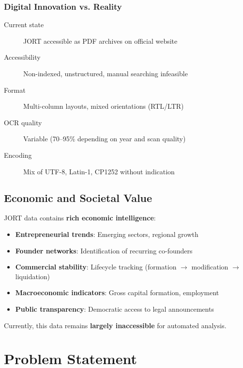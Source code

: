 \documentclass[12pt,a4paper]{report}
\begin{document}
\subsection{Digital Innovation vs. Reality}

\begin{description}
    \item[Current state] JORT accessible as PDF archives on official website
    \item[Accessibility] Non-indexed, unstructured, manual searching infeasible
    \item[Format] Multi-column layouts, mixed orientations (RTL/LTR)
    \item[OCR quality] Variable (70--95\% depending on year and scan quality)
    \item[Encoding] Mix of UTF-8, Latin-1, CP1252 without indication
\end{description}

\section{Economic and Societal Value}

JORT data contains \textbf{rich economic intelligence}:

\begin{itemize}
    \item \textbf{Entrepreneurial trends}: Emerging sectors, regional growth
    \item \textbf{Founder networks}: Identification of recurring co-founders
    \item \textbf{Commercial stability}: Lifecycle tracking (formation $\rightarrow$ modification $\rightarrow$ liquidation)
    \item \textbf{Macroeconomic indicators}: Gross capital formation, employment
    \item \textbf{Public transparency}: Democratic access to legal announcements
\end{itemize}

Currently, this data remains \textbf{largely inaccessible} for automated analysis.

\chapter{Problem Statement}
\end{document}
